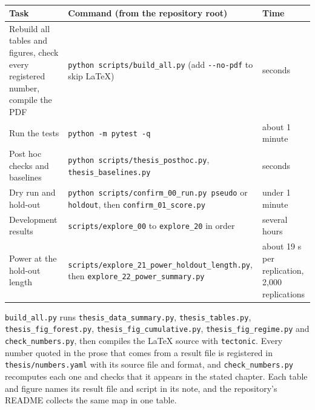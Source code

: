 \begin{table}[t]
\centering{}\footnotesize
\caption{}\label{tab:reproduce}
\begin{tabular}{>{\raggedright\arraybackslash}p{4.6cm}>{\raggedright\arraybackslash}p{6.6cm}>{\raggedright\arraybackslash}p{2.4cm}}
\toprule
Task & Command (from the repository root) & Time\\
\midrule
Rebuild all tables and figures, check every registered number, compile the PDF & \texttt{python scripts/build\_all.py} (add \texttt{-{}-no-pdf} to skip LaTeX) & seconds\\
Run the tests & \texttt{python -m pytest -q} & about 1 minute\\
Post hoc checks and baselines & \texttt{python scripts/thesis\_posthoc.py}, \texttt{thesis\_baselines.py} & seconds\\
Dry run and hold-out & \texttt{python scripts/confirm\_00\_run.py pseudo} or \texttt{holdout}, then \texttt{confirm\_01\_score.py} & under 1 minute\\
Development results & \texttt{scripts/explore\_00} to \texttt{explore\_20} in order & several hours\\
Power at the hold-out length & \texttt{scripts/explore\_21\_power\_holdout\_length.py}, then \texttt{explore\_22\_power\_summary.py} & about 19 s per replication, 2,000 replications\\
\bottomrule
\end{tabular}
\end{table}

\texttt{build\_all.py} runs \texttt{thesis\_data\_summary.py}, \texttt{thesis\_tables.py}, \texttt{thesis\_fig\_forest.py}, \texttt{thesis\_fig\_cumulative.py}, \texttt{thesis\_fig\_regime.py} and \texttt{check\_numbers.py}, then compiles the LaTeX source with \texttt{tectonic}. Every number quoted in the prose that comes from a result file is registered in \texttt{thesis/numbers.yaml} with its source file and format, and \texttt{check\_numbers.py} recomputes each one and checks that it appears in the stated chapter. Each table and figure names its result file and script in its note, and the repository's README collects the same map in one table.


